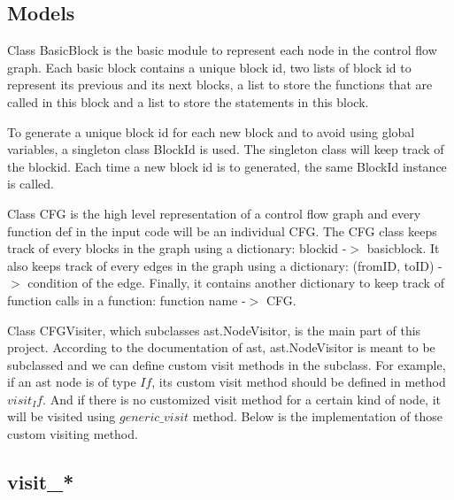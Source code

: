 \documentclass[11pt]{article}
\begin{document}
\subsection{Models}

Class BasicBlock is the basic module to represent each node in the control flow graph. Each basic block contains a unique block id, two lists of block id to represent its previous and its next blocks, a list to store the functions that are called in this block and a list to store the statements in this block.

To generate a unique block id for each new block and to avoid using global variables, a singleton class BlockId is used. The singleton class will keep track of the blockid. Each time a new block id is to generated, the same BlockId instance is called.

Class CFG is the high level representation of a control flow graph and every function def in the input code will be an individual CFG. The CFG class keeps track of every blocks in the graph using a dictionary: blockid -$>$ basicblock. It also keeps track of every edges in the graph using a dictionary: (fromID, toID) -$>$ condition of the edge. Finally, it contains another dictionary to keep track of function calls in a function: function name -$>$ CFG.

Class CFGVisiter, which subclasses ast.NodeVisitor, is the main part of this project. According to the documentation of ast, ast.NodeVisitor is meant to be subclassed and we can define custom visit methods in the subclass. For example, if an ast node is of type $If$, its custom visit method should be defined in method $visit_If$. And if there is no customized visit method for a certain kind of node, it will be visited using $generic\_visit$ method. Below is the implementation of those custom visiting method.

\subsection{visit\_*}
\end{document}
